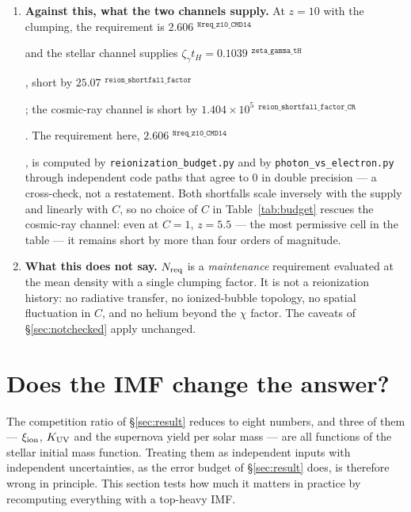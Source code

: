 \documentclass[11pt,a4paper]{article}
\newif\ifprovdraft
\newcommand{\src}[1]{%
  \ifprovdraft
    \ifmmode{}^{\text{\color{gray}\scriptsize\texttt{#1}}}%
    \else{\color{gray}\scriptsize$^{\texttt{#1}}$}%
    \fi
  \fi}
\begin{document}
\begin{enumerate}
      quantitative content of the statement that it \emph{completes} near
      $z\approx6$ rather than beginning there.
\item \textbf{Against this, what the two channels supply.} At $z=10$ with the
      \cite{md14} clumping, the requirement is
      $2.606$\src{Nreq\_z10\_CMD14} and the stellar channel supplies
      $\zeta_\gamma t_H = 0.1039$\src{zeta\_gamma\_tH}, short by
      $25.07$\src{reion\_shortfall\_factor}; the cosmic-ray channel is short by
      $1.404\times10^{5}$\src{reion\_shortfall\_factor\_CR}. The requirement
      here, $2.606$\src{Nreq\_z10\_CMD14}, is computed by
      \texttt{reionization\_budget.py} and by
      \texttt{photon\_vs\_electron.py} through independent code paths that
      agree to $0$ in double precision --- a cross-check, not a restatement.
      Both shortfalls
      scale inversely with the supply and linearly with $C$, so no choice of
      $C$ in Table~\ref{tab:budget} rescues the cosmic-ray channel: even at
      $C=1$, $z=5.5$ --- the most permissive cell in the table --- it remains
      short by more than four orders of magnitude.
\item \textbf{What this does not say.} $N_{\rm req}$ is a \emph{maintenance}
      requirement evaluated at the mean density with a single clumping factor.
      It is not a reionization history: no radiative transfer, no ionized-bubble
      topology, no spatial fluctuation in $C$, and no helium beyond the $\chi$
      factor. The caveats of \S\ref{sec:notchecked} apply unchanged.
\end{enumerate}

\clearpage
\section{Does the IMF change the answer?}\label{sec:imf}
The competition ratio of \S\ref{sec:result} reduces to eight numbers, and three
of them --- $\xi_{\rm ion}$, $K_{\rm UV}$ and the supernova yield per solar
mass --- are all functions of the stellar initial mass function. Treating them
as independent inputs with independent uncertainties, as the error budget of
\S\ref{sec:result} does, is therefore wrong in principle. This section tests
how much it matters in practice by recomputing everything with a top-heavy IMF.
\end{document}
